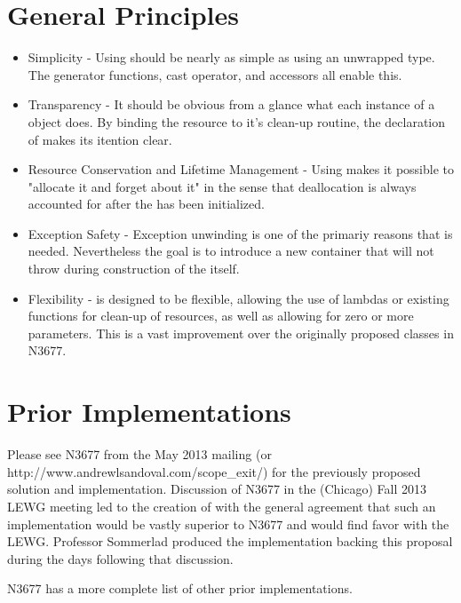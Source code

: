 \documentclass[ebook,11pt,article]{memoir}
\begin{document}
\section{General Principles}
\begin{itemize}
\item Simplicity - Using  should be nearly as simple as using an unwrapped type.  The generator functions, cast operator, and accessors all enable this.
\item Transparency - It should be obvious from a glance what each instance of a  object does.  By binding the resource to it's clean-up routine, the declaration of  makes its itention clear.
\item Resource Conservation and Lifetime Management - Using  makes it possible to "allocate it and forget about it" in the sense that deallocation is always accounted for after the  has been initialized.
\item Exception Safety - Exception unwinding is one of the primariy reasons that  is needed.  Nevertheless the goal is to introduce a new container that will not throw during construction of the  itself.
\item Flexibility -  is designed to be flexible, allowing the use of lambdas or existing functions for clean-up of resources, as well as allowing for zero or more parameters.  This is a vast improvement over the originally proposed classes in N3677.
\end{itemize}

\section{Prior Implementations}
Please see N3677 from the May 2013 mailing (or http://www.andrewlsandoval.com/scope_exit/) for the previously proposed solution and implementation.  Discussion of N3677 in the (Chicago) Fall 2013 LEWG meeting led to the creation of  with the general agreement that such an implementation would be vastly superior to N3677 and would find favor with the LEWG.  Professor Sommerlad produced the implementation backing this proposal during the days following that discussion.

N3677 has a more complete list of other prior implementations.
\end{document}
